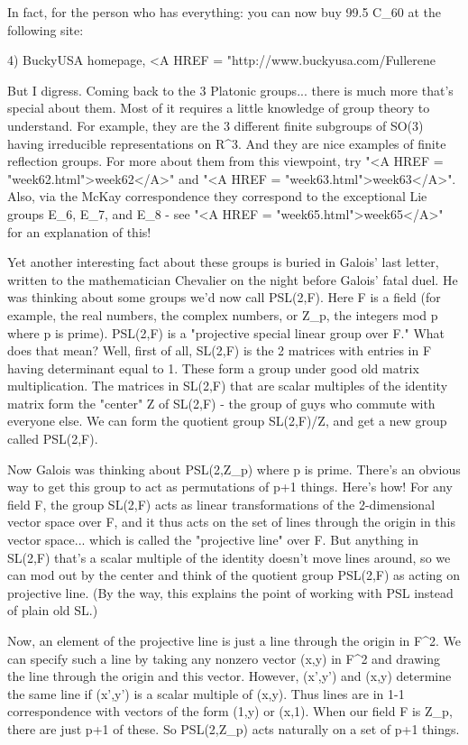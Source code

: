In fact, for the person who has everything: you can now buy 99.5%
C_{60} at the following site:

4) BuckyUSA homepage, <A HREF =
"http://www.buckyusa.com/Fullerene%


But I digress.  Coming back to the 3 Platonic groups... there is much
more that's special about them.  Most of it requires a little knowledge
of group theory to understand.  For example, they are the 3 different
finite subgroups of SO(3) having irreducible representations on R^{3}.
And they are nice examples of finite reflection groups.  For more about
them from this viewpoint, try "<A HREF =
"week62.html">week62</A>" and "<A HREF =
"week63.html">week63</A>".  Also, via the McKay correspondence they
correspond to the exceptional Lie groups E_{6}, 
E_{7}, and E_{8} - see "<A
HREF = "week65.html">week65</A>" for an explanation of this!


Yet another interesting fact about these groups is buried in Galois'
last letter, written to the mathematician Chevalier on the night before
Galois' fatal duel.  He was thinking about some groups we'd now call
PSL(2,F).  Here F is a field (for example, the real numbers, the complex
numbers, or Z_{p}, the integers mod p where p is prime).
PSL(2,F) is a "projective special linear group over F." What
does that mean?  Well, first of all, SL(2,F) is the 2 matrices with
entries in F having determinant equal to 1.  These form a group under
good old matrix multiplication.  The matrices in SL(2,F) that are scalar
multiples of the identity matrix form the "center" Z of
SL(2,F) - the group of guys who commute with everyone else.  We can
form the quotient group SL(2,F)/Z, and get a new group called PSL(2,F).


Now Galois was thinking about PSL(2,Z_{p}) where p is prime.
There's an obvious way to get this group to act as permutations of p+1
things.  Here's how!  For any field F, the group SL(2,F) acts as linear
transformations of the 2-dimensional vector space over F, and it thus
acts on the set of lines through the origin in this vector space...
which is called the "projective line" over F.  But anything
in SL(2,F) that's a scalar multiple of the identity doesn't move lines
around, so we can mod out by the center and think of the quotient group
PSL(2,F) as acting on projective line.  (By the way, this explains the
point of working with PSL instead of plain old SL.)


Now, an element of the projective line is just a line through the
origin in F^{2}.  We can specify such a line by taking any
nonzero vector (x,y) in F^{2} and drawing the line through the
origin and this vector.  However, (x',y') and (x,y) determine the same
line if (x',y') is a scalar multiple of (x,y).  Thus lines are in 1-1
correspondence with vectors of the form (1,y) or (x,1).  When our field
F is Z_{p}, there are just p+1 of these.  So
PSL(2,Z_{p}) acts naturally on a set of p+1 things.

